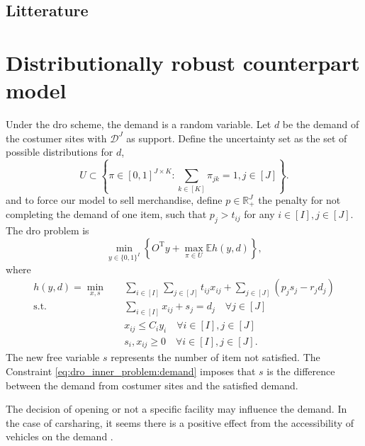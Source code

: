 \documentclass[12pt, letterpaper]{article}
\newcommand{\R}{\mathbb{R}}
\newcommand{\T}{\mathrm{T}}
\newcommand{\E}{\mathbb{E}}
\newcommand{\Dcal}{\mathcal{D}}
\begin{document}
	
	\subsection*{Litterature}
	
	\section{Distributionally robust counterpart model}
	Under the \gls{dro} scheme, the demand is a random variable. Let $d$ be the demand of the costumer sites with $\Dcal^J$ as support. Define the uncertainty set as the set of possible distributions for $d$,
	\begin{equation} \label{eq:def_uncertainty_set}
		U \subset \left\{\pi \in [0, 1]^{J \times K}: \sum_{k \in [K]} \pi_{jk} = 1, j \in [J]\right\}.
	\end{equation}
	and to force our model to sell merchandise, define $p \in \R_+^J$ the penalty for not completing the demand of one item, such that $p_j > t_{ij}$ for any $i \in [I], j \in [J]$. The \gls{dro} problem is
	\begin{equation}\label{eq:dro_outter_problem}
		\min_{y \in \{0, 1\}^I} \left\{O^\T y + \max_{\pi \in U} \E h(y, d)\right\},
	\end{equation}
	where
	\begin{subequations} \label{eq:dro_inner_problem}
		\begin{align}
			h(y, d) = \min_{x, s} &\quad \sum_{i \in [I]} \sum_{j \in [J]} t_{ij}x_{ij} + \sum_{j \in [J]} (p_j s_j - r_j d_j) \\
			\text{s.t.} &\quad \sum_{i \in [I]} x_{ij} + s_j = d_j \quad \forall j \in [J] \\ \label{eq:dro_inner_problem:demand}
			&\quad x_{ij} \le C_i y_i \quad \forall i \in [I], j \in [J] \\
			&\quad s_i, x_{ij} \ge 0 \quad \forall i \in [I], j \in [J].
		\end{align}
	\end{subequations}
	The new free variable $s$ represents the number of item not satisfied. The Constraint \eqref{eq:dro_inner_problem:demand} imposes that $s$ is the difference between the demand from costumer sites and the satisfied demand.
	
	
	The decision of opening or not a specific facility may influence the demand. In the case of carsharing, it seems there is a positive effect from the accessibility of vehicles on the demand \cite{ciari_modeling_2014}.
	
\end{document}
